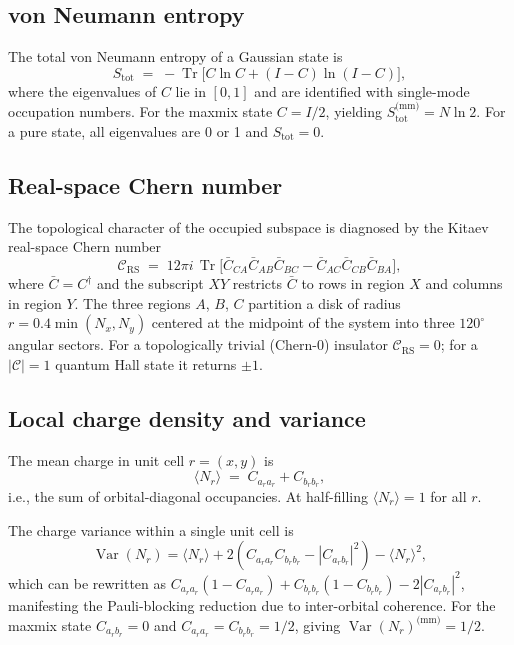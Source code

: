 \documentclass[twocolumn,aps,prx,10pt,floatfix]{revtex4-2}
\begin{document}
\subsection{von Neumann entropy}

The total von Neumann entropy of a Gaussian state is
\begin{equation}
  S_\text{tot} \;=\;
  -\operatorname{Tr}\!\bigl[C \ln C + (I - C)\ln(I - C)\bigr],
  \label{eq:entropy}
\end{equation}
where the eigenvalues of $C$ lie in $[0,1]$ and are identified with
single-mode occupation numbers.  For the maxmix state $C = I/2$, yielding
$S_\text{tot}^\text{(mm)} = N\ln 2$.  For a pure state, all eigenvalues are
0 or 1 and $S_\text{tot} = 0$.

\subsection{Real-space Chern number}

The topological character of the occupied subspace is diagnosed by the
Kitaev real-space Chern number~\cite{Kitaev2006}
\begin{equation}
  \mathcal{C}_\text{RS} \;=\;
  12\pi i\,\operatorname{Tr}\!\bigl[
    \bar{C}_{CA}\bar{C}_{AB}\bar{C}_{BC}
    - \bar{C}_{AC}\bar{C}_{CB}\bar{C}_{BA}
  \bigr],
  \label{eq:chern}
\end{equation}
where $\bar{C} = C^\dagger$ and the subscript $XY$ restricts $\bar{C}$ to
rows in region $X$ and columns in region $Y$.  The three regions $A$, $B$, $C$
partition a disk of radius $r = 0.4\min(N_x,N_y)$ centered at the midpoint of
the system into three $120^\circ$ angular sectors.  For a topologically trivial
(Chern-0) insulator $\mathcal{C}_\text{RS} = 0$; for a $|\mathcal{C}|=1$ quantum
Hall state it returns $\pm1$.

\subsection{Local charge density and variance}

The mean charge in unit cell $r = (x,y)$ is
\begin{equation}
  \langle N_r \rangle \;=\; C_{a_r a_r} + C_{b_r b_r},
  \label{eq:localcharge}
\end{equation}
i.e., the sum of orbital-diagonal occupancies.  At half-filling
$\langle N_r \rangle = 1$ for all $r$.

The charge variance within a single unit cell is
\begin{equation}
  \operatorname{Var}(N_r)
  = \langle N_r\rangle + 2\!\left(C_{a_r a_r}C_{b_r b_r}
    - |C_{a_r b_r}|^2\right)
    - \langle N_r\rangle^2,
  \label{eq:localvar}
\end{equation}
which can be rewritten as
$C_{a_r a_r}(1-C_{a_r a_r}) + C_{b_r b_r}(1-C_{b_r b_r})
- 2|C_{a_r b_r}|^2$,
manifesting the Pauli-blocking reduction due to inter-orbital coherence.
For the maxmix state $C_{a_r b_r} = 0$ and $C_{a_r a_r} = C_{b_r b_r} = 1/2$,
giving $\operatorname{Var}(N_r)^\text{(mm)} = 1/2$.
\end{document}
